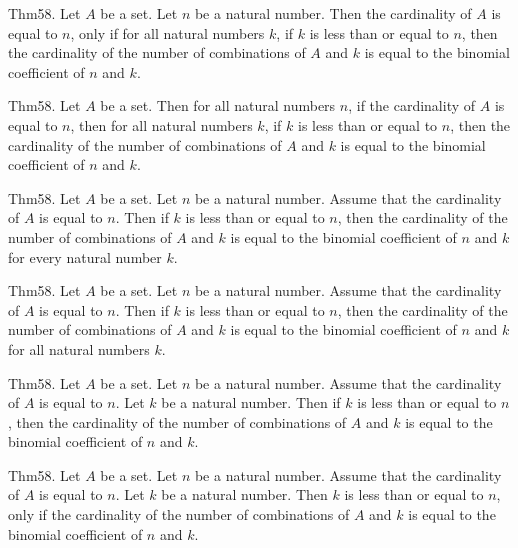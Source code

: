 \documentclass{article}
\begin{document}
Thm58. Let $A$ be a set. Let $n$ be a natural number. Then the cardinality of $A$ is equal to $n$, only if for all natural numbers $k$, if $k$ is less than or equal to $n$, then the cardinality of the number of combinations of $A$ and $k$ is equal to the binomial coefficient of $n$ and $k$.

Thm58. Let $A$ be a set. Then for all natural numbers $n$, if the cardinality of $A$ is equal to $n$, then for all natural numbers $k$, if $k$ is less than or equal to $n$, then the cardinality of the number of combinations of $A$ and $k$ is equal to the binomial coefficient of $n$ and $k$.

Thm58. Let $A$ be a set. Let $n$ be a natural number. Assume that the cardinality of $A$ is equal to $n$. Then if $k$ is less than or equal to $n$, then the cardinality of the number of combinations of $A$ and $k$ is equal to the binomial coefficient of $n$ and $k$ for every natural number $k$.

Thm58. Let $A$ be a set. Let $n$ be a natural number. Assume that the cardinality of $A$ is equal to $n$. Then if $k$ is less than or equal to $n$, then the cardinality of the number of combinations of $A$ and $k$ is equal to the binomial coefficient of $n$ and $k$ for all natural numbers $k$.

Thm58. Let $A$ be a set. Let $n$ be a natural number. Assume that the cardinality of $A$ is equal to $n$. Let $k$ be a natural number. Then if $k$ is less than or equal to $n$, then the cardinality of the number of combinations of $A$ and $k$ is equal to the binomial coefficient of $n$ and $k$.

Thm58. Let $A$ be a set. Let $n$ be a natural number. Assume that the cardinality of $A$ is equal to $n$. Let $k$ be a natural number. Then $k$ is less than or equal to $n$, only if the cardinality of the number of combinations of $A$ and $k$ is equal to the binomial coefficient of $n$ and $k$.
\end{document}

